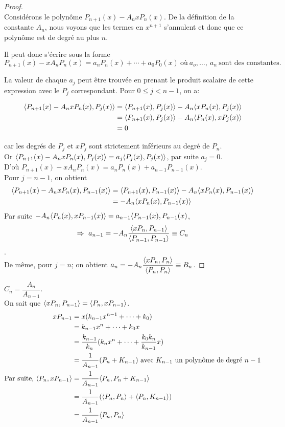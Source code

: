 \begin{proof}
$ $
\\Considérons le polynôme $P_{n+1}(x)- A_n x P_n(x)$. De la définition de la constante $A_n$, nous voyons que les termes en $x^{n+1}$ s'annulent et donc que ce polynôme est de degré au plus  $n$. 

Il peut donc s'écrire sous la forme $$P_{n+1}(x)-x A_n P_n(x)= a_n P_n(x)+ \cdots + a_0 P_0(x)\ \text{où} \ a_o, \ldots,\ a_n \ \text{sont des constantes.}$$

La valeur de chaque $a_j$ peut être trouvée en prenant le produit scalaire de cette expression avec le $P_j$ correspondant. Pour $ 0 \leqslant j < n-1$, on a:

\begin{align*}
\langle P_{n+1}(x)- A_n x P_n(x),P_j(x) \rangle &= \langle P_{n+1}(x),P_j(x) \rangle - A_n \langle x P_n(x),P_j(x) \rangle \\
&= \langle P_{n+1}(x),P_j(x) \rangle - A_n \langle P_n(x),xP_j(x) \rangle \\
&= 0
\end{align*}

car les degrés de $P_j$ et $xP_j$ sont strictement inférieurs au degré de $P_n$. 
\\Or $\langle P_{n+1}(x)- A_n x P_n(x),P_j(x) \rangle = a_j \langle P_j(x),P_j(x) \rangle$, par suite $a_j=0$.
\\D'où $P_{n+1}(x)-x A_n P_n(x)= a_n P_n(x) + a_{n-1} P_{n-1}(x)$.
\\Pour $j = n-1$, on obtient
\begin{align*}
\langle P_{n+1}(x)- A_n x P_n(x),P_{n-1}(x) \rangle &= \langle P_{n+1}(x),P_{n-1}(x) \rangle - A_n \langle x P_n(x),P_{n-1}(x) \rangle \\
&= - A_n \langle xP_n(x),P_{n-1}(x) \rangle
\end{align*}
Par suite $- A_n \langle P_n(x),xP_{n-1}(x) \rangle = a_{n-1} \langle P_{n-1}(x),P_{n-1}(x)$,
$$\Rightarrow \  a_{n-1}= -A_n \dfrac{\langle x P_n, P_{n-1} \rangle}{\langle P_{n-1}, P_{n-1} \rangle}\equiv C_n$$.
\\De même, pour $j = n$; on obtient $a_{n}= -A_n \dfrac{\langle x P_n, P_n \rangle}{\langle P_n, P_n \rangle}\equiv B_n$.
\end{proof}

\brmq
$C_n=\dfrac{A_n}{A_{n-1}}$.
\\On sait que $\langle x P_n, P_{n-1} \rangle=\langle P_n, xP_{n-1} \rangle$.
\begin{align*}
xP_{n-1} &= x(k_{n-1}x^{n-1}+\cdots+k_0) \\
         &=k_{n-1}x^n+\cdots+k_0x \\
         &=\dfrac{k_{n-1}}{k_n}(k_n x^n+\cdots+\dfrac{k_0 k_n}{k_{n-1}}x)\\
         &=\dfrac{1}{A_{n-1}}(P_n+K_{n-1}) \text{ avec } K_{n-1} \text{ un polynôme de degré }n-1\\
\text{Par suite, }\langle P_n, xP_{n-1} \rangle &=\dfrac{1}{A_{n-1}} \langle P_n,P_n+K_{n-1} \rangle \\
                      &=\dfrac{1}{A_{n-1}}(\langle P_n,P_n\rangle + \langle P_n,K_{n-1} \rangle)\\
                      &=\dfrac{1}{A_{n-1}}\langle P_n,P_n\rangle
\end{align*}
\ermq

